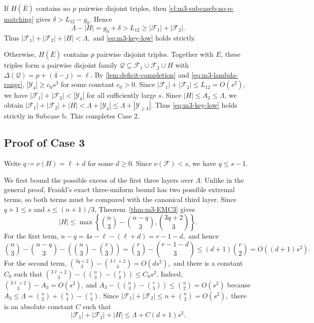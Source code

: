 \documentclass[10pt,a4paper]{article}
\numberwithin{equation}{section}
\theoremstyle{definition}
\newcommand{\F}{\mathcal F}
\newcommand{\Y}{\mathcal Y}
\begin{document}
If \(H(\overline E)\) contains no \(p\) pairwise disjoint triples, then
\cref{cl:m3-subcaseb-no-p-matching} gives \(\delta>L_{12}-g_0\).  Hence
\[
    \Lambda-|H|
    =
    g_0+\delta
    >
    L_{12}
    \ge
    |\F_1|+|\F_2|.
\]
Thus
\(|\F_1|+|\F_2|+|H|<\Lambda,\)
and \eqref{eq:m3-key-low} holds strictly.

Otherwise, \(H(\overline E)\) contains \(p\) pairwise disjoint triples.
Together with \(E\), these triples form a pairwise disjoint family
\(\mathcal Q\subseteq\F_1\cup\F_2\cup H\) with
\(\Delta(\mathcal Q)=p+(4-j)=\ell.\)
By \cref{lem:deficit-completion} and \eqref{eq:m3-lambda-range},
\(|\Y_4|\ge c_0s^3\) for some constant \(c_0>0\).  Since
\(|\F_1|+|\F_2|\le L_{12}=O(s^2)\), we have
\(|\F_1|+|\F_2|<|\Y_4|\)
for all sufficiently large \(s\).  Since \(|H|\le A_3\le\Lambda\), we obtain $|\F_1|+|\F_2|+|H| < \Lambda+|\Y_4| \le \Lambda+|\Y_{\ge4}|$.
Thus \eqref{eq:m3-key-low} holds strictly in Subcase b.
This completes Case 2.

\subsection{Proof of Case 3}

Write
\(q\coloneqq \nu(H)=\ell+d\)
for some \(d\ge0\).  Since \(\nu(\F)<s\), we have \(q\le s-1\).

We first bound the possible excess of the first three layers over
\(\Lambda\).  Unlike in the general proof, Frankl's exact three-uniform
bound has two possible extremal terms, so both terms must be compared with
the canonical third layer.  Since \(q+1\le s\) and \(s\le(n+1)/3\),
Theorem~\ref{thm:m3-EMC3} gives
\[
    |H|
    \le
    \max\left\{
    \binom n3-\binom{n-q}{3},
    \binom{3q+2}{3}
    \right\}.
\]
For the first term,
\(n-q=4s-\ell-(\ell+d)=r-1-d,\)
and hence
\[
    \binom n3-\binom{n-q}{3}
    -
    \left(\binom n3-\binom r3\right)
    =
    \binom r3-\binom{r-1-d}{3}
    \le
    (d+1)\binom r2
    =
    O((d+1)s^2).
\]
For the second term,
\(\binom{3q+2}{3}-\binom{3\ell+2}{3}=O(ds^2),\)
and there is a constant \(C_0\) such that
\(\binom{3\ell+2}{3} - \left(\binom n3-\binom r3\right) \le C_0s^2.\)
Indeed, \(\binom{3\ell+2}{3}-A_3=O(s^2)\), and
\(A_3-\left(\binom n3-\binom r3\right) \le \binom a2=O(s^2)\)
because \(A_3\le\Lambda=\binom a2+\binom n3-\binom r3\).  Since
\(|\F_1|+|\F_2|\le n+\binom n2=O(s^2),\)
there is an absolute constant \(C\) such that
\begin{equation}\label{eq:m3-overflow-excess}
    |\F_1|+|\F_2|+|H|
    \le
    \Lambda+C(d+1)s^2.
\end{equation}
\end{document}

